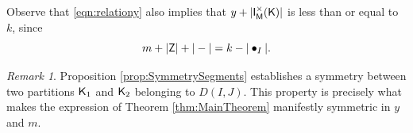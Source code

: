 \documentclass[11pt, a4paper, oneside, reqno]{amsart}
\newcommand{\sK}{{\sf K}}
\newcommand{\setK}{{D(I,J)}}
\newcommand{\sM}{{\sf M}}
\newtheorem{lemma}[theorem]{Lemma}
\theoremstyle{remark}
\newtheorem{remark}[theorem]{Remark}
\theoremstyle{definition}
\numberwithin{equation}{section}
\begin{document}
Observe that \eqref{eqn:relationy} also implies that $y+|{\sf I}_{\sM}^{\times}({\sK})|$ is less than or equal to $k$, since
\begin{equation}
	\label{eqn:relationtofixedpoints}
	m+ |{\sf Z}|+|-| = k - |\bullet_I|.
\end{equation}
\begin{remark}
Proposition \ref{prop:SymmetrySegments} establishes a symmetry between two partitions $\sK_1$ and $\sK_2$ belonging to $\setK$. This property is precisely what makes the expression of Theorem \ref{thm:MainTheorem} manifestly symmetric in $y$ and $m$.    
\end{remark}
    
\end{document}
